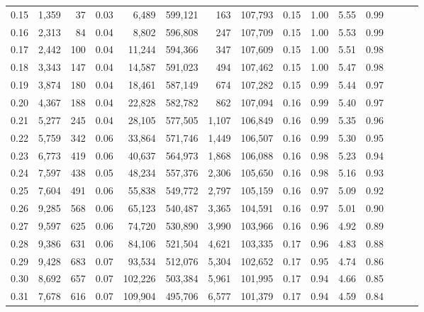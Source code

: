 \begin{tabular}{rrrrrrrrrrrrrrr}
0.15 &   1,359 &     37 &  0.03 &    6,489 &  599,121 &      163 &  107,793 &  0.15 &  1.00 &  5.55 &      0.99 \\
0.16 &   2,313 &     84 &  0.04 &    8,802 &  596,808 &      247 &  107,709 &  0.15 &  1.00 &  5.53 &      0.99 \\
0.17 &   2,442 &    100 &  0.04 &   11,244 &  594,366 &      347 &  107,609 &  0.15 &  1.00 &  5.51 &      0.98 \\
0.18 &   3,343 &    147 &  0.04 &   14,587 &  591,023 &      494 &  107,462 &  0.15 &  1.00 &  5.47 &      0.98 \\
0.19 &   3,874 &    180 &  0.04 &   18,461 &  587,149 &      674 &  107,282 &  0.15 &  0.99 &  5.44 &      0.97 \\
0.20 &   4,367 &    188 &  0.04 &   22,828 &  582,782 &      862 &  107,094 &  0.16 &  0.99 &  5.40 &      0.97 \\
0.21 &   5,277 &    245 &  0.04 &   28,105 &  577,505 &    1,107 &  106,849 &  0.16 &  0.99 &  5.35 &      0.96 \\
0.22 &   5,759 &    342 &  0.06 &   33,864 &  571,746 &    1,449 &  106,507 &  0.16 &  0.99 &  5.30 &      0.95 \\
0.23 &   6,773 &    419 &  0.06 &   40,637 &  564,973 &    1,868 &  106,088 &  0.16 &  0.98 &  5.23 &      0.94 \\
0.24 &   7,597 &    438 &  0.05 &   48,234 &  557,376 &    2,306 &  105,650 &  0.16 &  0.98 &  5.16 &      0.93 \\
0.25 &   7,604 &    491 &  0.06 &   55,838 &  549,772 &    2,797 &  105,159 &  0.16 &  0.97 &  5.09 &      0.92 \\
0.26 &   9,285 &    568 &  0.06 &   65,123 &  540,487 &    3,365 &  104,591 &  0.16 &  0.97 &  5.01 &      0.90 \\
0.27 &   9,597 &    625 &  0.06 &   74,720 &  530,890 &    3,990 &  103,966 &  0.16 &  0.96 &  4.92 &      0.89 \\
0.28 &   9,386 &    631 &  0.06 &   84,106 &  521,504 &    4,621 &  103,335 &  0.17 &  0.96 &  4.83 &      0.88 \\
0.29 &   9,428 &    683 &  0.07 &   93,534 &  512,076 &    5,304 &  102,652 &  0.17 &  0.95 &  4.74 &      0.86 \\
0.30 &   8,692 &    657 &  0.07 &  102,226 &  503,384 &    5,961 &  101,995 &  0.17 &  0.94 &  4.66 &      0.85 \\
0.31 &   7,678 &    616 &  0.07 &  109,904 &  495,706 &    6,577 &  101,379 &  0.17 &  0.94 &  4.59 &      0.84 \\

\end{tabular}

